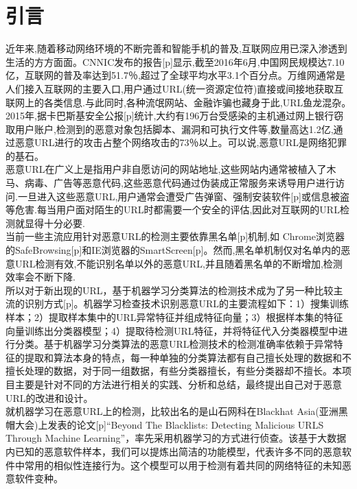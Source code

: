 \section{引言}
近年来,随着移动网络环境的不断完善和智能手机的普及,互联网应用已深入渗透到生活的方方面面。CNNIC发布的报告[p]显示,截至2016年6月,中国网民规模达7.10亿，互联网的普及率达到51.7％,超过了全球平均水平3.1个百分点。万维网通常是人们接入互联网的主要入口,用户通过URL(统一资源定位符)直接或间接地获取互联网上的各类信息.与此同时,各种流氓网站、金融诈骗也藏身于此,URL鱼龙混杂。2015年,据卡巴斯基安全公报[p]统计,大约有196万台受感染的主机通过网上银行窃取用户账户,检测到的恶意对象包括脚本、漏洞和可执行文件等,数量高达1.2亿,通过恶意URL进行的攻击占整个网络攻击的73％以上。可以说,恶意URL是网络犯罪的基石。
\\\indent{}恶意URL在广义上是指用户非自愿访问的网站地址,这些网站内通常被植入了木马、病毒、广告等恶意代码,这些恶意代码通过伪装成正常服务来诱导用户进行访问.一旦进入这些恶意URL,用户通常会遭受广告弹窗、强制安装软件[p]或信息被盗等危害.每当用户面对陌生的URL时都需要一个安全的评估,因此对互联网的URL检测就显得十分必要.
\\\indent{}当前一些主流应用针对恶意URL的检测主要依靠黑名单[p]机制,如 Chrome浏览器的SafeBrowsing[p]和IE浏览器的SmartScreen[p]。然而,黑名单机制仅对名单内的恶意URL检测有效,不能识别名单以外的恶意URL,并且随着黑名单的不断增加,检测效率会不断下降.
\\\indent{}所以对于新出现的URL，基于机器学习分类算法的检测技术成为了另一种比较主流的识别方式[p]。机器学习检查技术识别恶意URL的主要流程如下：1）搜集训练样本；2）提取样本集中的URL异常特征并组成特征向量；3）根据样本集的特征向量训练出分类器模型；4）提取待检测URL特征，并将特征代入分类器模型中进行分类。基于机器学习分类算法的恶意URL检测技术的检测准确率依赖于异常特征的提取和算法本身的特点，每一种单独的分类算法都有自己擅长处理的数据和不擅长处理的数据，对于同一组数据，有些分类器擅长，有些分类器却不擅长。本项目主要是针对不同的方法进行相关的实践、分析和总结，最终提出自己对于恶意URL的改进和设计。
\\\indent{}就机器学习在恶意URL上的检测，比较出名的是山石网科在Blackhat Asia(亚洲黑帽大会)上发表的论文[p]“Beyond The Blacklists: Detecting Malicious URLS Through Machine Learning”，率先采用机器学习的方式进行侦查。该基于大数据内已知的恶意软件样本，我们可以提炼出简洁的功能模型，代表许多不同的恶意软件中常用的相似性连接行为。这个模型可以用于检测有着共同的网络特征的未知恶意软件变种。
